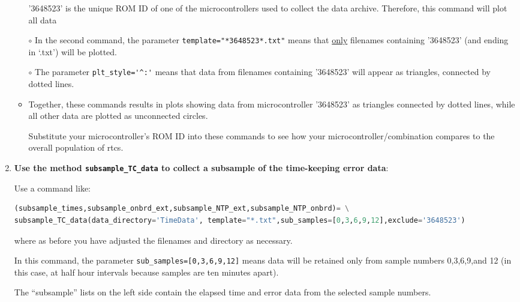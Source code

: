 \begin{enumerate}
\begin{itemize}
		\smallskip
		'3648523' is the unique ROM ID of one of the microcontrollers used to collect the data archive. 
		Therefore, this command will plot all data 
		
		\item[$\circ$] In the second command, the parameter \lstinline{template="*3648523*.txt"} means that \underline{only} filenames containing '3648523' (and ending in `.txt') will be plotted. 
		
		\item[$\circ$] The parameter \lstinline{plt_style='^:'} means that data from filenames containing '3648523' will appear as triangles, connected by dotted lines.
		
		\item[$\circ$] Together, these commands results in plots showing data from microcontroller '3648523' as triangles connected by dotted lines, while all other data are plotted as unconnected circles.
		
		\smallskip
		Substitute your microcontroller's ROM ID into these commands to see how your microcontroller/\rtc combination compares to the overall population of 
		rtcs.
	\end{itemize}
	
	\item \textbf{Use the \python method \lstinline{subsample_TC_data} to collect a subsample of the time-keeping error data}:
	
	Use a command like:
\begin{lstlisting}[language=Python]
(subsample_times,subsample_onbrd_ext,subsample_NTP_ext,subsample_NTP_onbrd)= \
subsample_TC_data(data_directory='TimeData', template="*.txt",sub_samples=[0,3,6,9,12],exclude='3648523')
\end{lstlisting}
	where as before you have adjusted the filenames and directory as necessary.

	In this command, the parameter \lstinline{sub_samples=[0,3,6,9,12]} means data will be retained only from sample numbers 0,3,6,9,and 12 (in this case, at half hour intervals because samples are ten minutes apart). 

	The ``subsample'' lists on the left side contain the elapsed time and error data from the selected sample numbers.
	

\end{enumerate}
